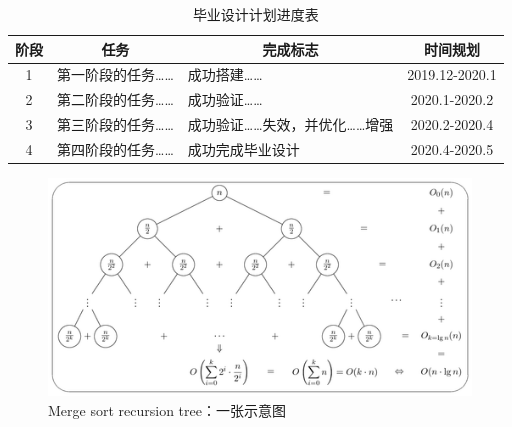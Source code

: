 \documentclass[UTF8,AutoFakeBold,AutoFakeSlant,zihao=-4]{ctexart}
\begin{document}
\begin{table}[!ht]
  \centering
  \caption{毕业设计计划进度表}
  \label{tab:progress}
  \begin{tabular}{@{}cllc@{}}
    \toprule
    阶段 & \multicolumn{1}{c}{任务} & \multicolumn{1}{c}{完成标志} & 时间规划       \\ \midrule
    1    & 第一阶段的任务……          & 成功搭建……                    & 2019.12-2020.1 \\ \midrule
    2    & 第二阶段的任务……          & 成功验证……                    & 2020.1-2020.2  \\ \midrule
    3    & 第三阶段的任务……          & 成功验证……失效，并优化……增强  & 2020.2-2020.4  \\ \midrule
    4    & 第四阶段的任务……          & 成功完成毕业设计              & 2020.4-2020.5  \\ \bottomrule
  \end{tabular}
\end{table}


\begin{figure}[!ht]
  \centering
  \includegraphics[width=0.6\linewidth]{img/merge-sort-recursion-tree}
  \caption{Merge sort recursion tree：一张示意图}
  \label{fig:mergesort}
\end{figure}
\end{document}
